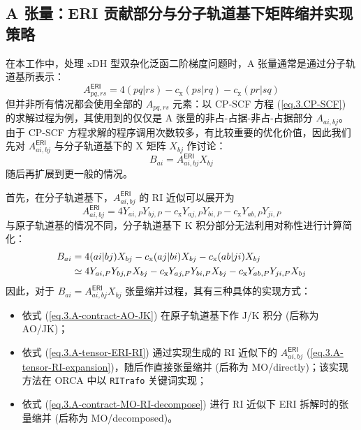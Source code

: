 \subsection{A 张量：ERI 贡献部分与分子轨道基下矩阵缩并实现策略}

在本工作中，处理 xDH 型双杂化泛函二阶梯度问题时，A 张量通常是通过分子轨道基所表示：
\begin{equation}
  \label{eq.3.A-tensor-RI-expansion}
  A_{pq, rs}^\textsf{ERI} = 4 (pq | rs) - c_\mathrm{x} (ps | rq) - c_\mathrm{x} (pr | sq)
\end{equation}
但并非所有情况都会使用全部的 $A_{pq, rs}$ 元素：以 CP-SCF 方程 (\ref{eq.3.CP-SCF}) 的求解过程为例，其使用到的仅仅是 A 张量的非占-占据-非占-占据部分 $A_{ai, bj}$。由于 CP-SCF 方程求解的程序调用次数较多，有比较重要的优化价值，因此我们先对 $A_{ai, bj}^\textsf{ERI}$ 与分子轨道基下的 X 矩阵 $X_{bj}$ 作讨论：
\begin{equation}
  \label{eq.3.A-contract-MO-directly}
  B_{ai} = A_{ai, bj}^\textsf{ERI} X_{bj}
\end{equation}
随后再扩展到更一般的情况。

首先，在分子轨道基下，$A_{ai, bj}^\textsf{ERI}$ 的 RI 近似可以展开为
\begin{equation}
  \label{eq.3.A-tensor-ERI-RI}
  A_{ai, bj}^\textsf{ERI} = 4 Y_{ai, P} Y_{bj, P} - c_\mathrm{x} Y_{aj, P} Y_{bi, P} - c_\mathrm{x} Y_{ab, P} Y_{ji, P}
\end{equation}
与原子轨道基的情况不同，分子轨道基下 K 积分部分无法利用对称性进行计算简化：
\begin{align}
  \label{eq.3.A-contract-MO-RI-decompose}
  B_{ai} &= 4 (ai | bj) X_{bj} - c_\mathrm{x} (aj | bi) X_{bj} - c_\mathrm{x} (ab | ji) X_{bj} \notag\\
  &\simeq 4 Y_{ai, P} Y_{bj, P} X_{bj} - c_\mathrm{x} Y_{aj, P} Y_{bi, P} X_{bj} - c_\mathrm{x} Y_{ab, P} Y_{ji, P} X_{bj}
\end{align}
因此，对于 $B_{ai} = A_{ai, bj}^\textsf{ERI} X_{bj}$ 张量缩并过程，其有三种具体的实现方式：
\begin{itemize}[nosep]
  \item 依式 (\ref{eq.3.A-contract-AO-JK}) 在原子轨道基下作 J/K 积分 (后称为 AO/JK)；
  \item 依式 (\ref{eq.3.A-tensor-ERI-RI}) 通过实现生成的 RI 近似下的 $A_{ai, bj}^\textsf{ERI}$ (\ref{eq.3.A-tensor-RI-expansion})，随后作直接张量缩并 (后称为 MO/directly)；该实现方法在 ORCA 中以 \verb|RITrafo| 关键词实现；
  \item 依式 (\ref{eq.3.A-contract-MO-RI-decompose}) 进行 RI 近似下 ERI 拆解时的张量缩并 (后称为 MO/decomposed)。
\end{itemize}



